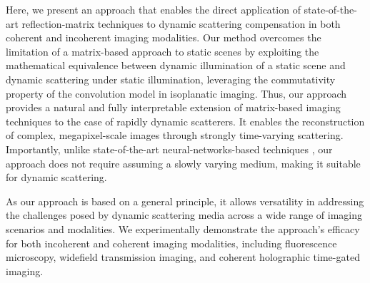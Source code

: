 \documentclass[pdflatex,sn-mathphys-num]{sn-jnl}%
\theoremstyle{thmstyleone}%
\theoremstyle{thmstyletwo}%
\theoremstyle{thmstylethree}%
\begin{document}
Here, we present an approach that enables the direct application of state-of-the-art reflection-matrix techniques to dynamic scattering compensation in both coherent and incoherent imaging modalities. Our method overcomes the limitation of a matrix-based approach to static scenes by exploiting the mathematical equivalence between dynamic illumination of a static scene and dynamic scattering under static illumination, leveraging the commutativity property of the convolution model in isoplanatic imaging. Thus, our approach provides a natural and fully interpretable extension of matrix-based imaging techniques to the case of rapidly dynamic scatterers. It enables the reconstruction of complex, megapixel-scale images through strongly time-varying scattering. Importantly, unlike state-of-the-art neural-networks-based techniques \cite{feng23}, our approach does not require assuming a slowly varying medium, making it suitable for dynamic scattering.


As our approach is based on a general principle, it allows versatility in addressing the challenges posed by dynamic scattering media across a wide range of imaging scenarios and modalities. 
We experimentally demonstrate the approach's efficacy for both incoherent and coherent imaging modalities, including fluorescence microscopy, widefield transmission imaging, and coherent holographic time-gated imaging.

\end{document}

